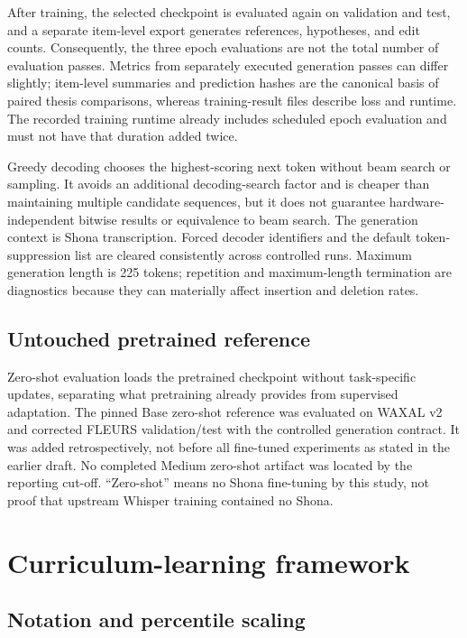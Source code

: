 \documentclass[12pt,a4paper]{report}
\begin{document}
After training, the selected checkpoint is evaluated again on validation and test, and a separate item-level export generates references, hypotheses, and edit counts. Consequently, the three epoch evaluations are not the total number of evaluation passes. Metrics from separately executed generation passes can differ slightly; item-level summaries and prediction hashes are the canonical basis of paired thesis comparisons, whereas training-result files describe loss and runtime. The recorded training runtime already includes scheduled epoch evaluation and must not have that duration added twice.

Greedy decoding chooses the highest-scoring next token without beam search or sampling. It avoids an additional decoding-search factor and is cheaper than maintaining multiple candidate sequences, but it does not guarantee hardware-independent bitwise results or equivalence to beam search. The generation context is Shona transcription. Forced decoder identifiers and the default token-suppression list are cleared consistently across controlled runs. Maximum generation length is 225 tokens; repetition and maximum-length termination are diagnostics because they can materially affect insertion and deletion rates.

\subsection{Untouched pretrained reference}

Zero-shot evaluation loads the pretrained checkpoint without task-specific updates, separating what pretraining already provides from supervised adaptation. The pinned Base zero-shot reference was evaluated on WAXAL v2 and corrected FLEURS validation/test with the controlled generation contract. It was added retrospectively, not before all fine-tuned experiments as stated in the earlier draft. No completed Medium zero-shot artifact was located by the reporting cut-off. ``Zero-shot'' means no Shona fine-tuning by this study, not proof that upstream Whisper training contained no Shona.

\section{Curriculum-learning framework}
\label{sec:curriculum}

\subsection{Notation and percentile scaling}
\end{document}
